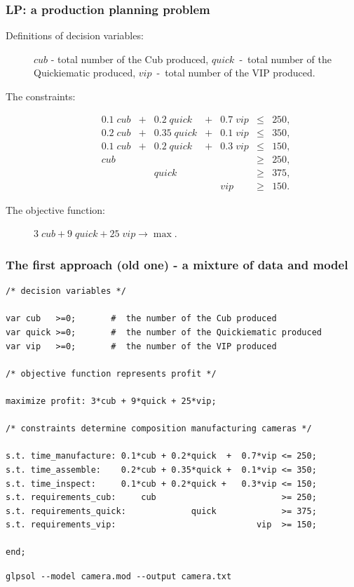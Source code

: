 \documentclass[landscape]{beamer}
\begin{document}
\begin{frame}
  \frametitle{LP: a production planning problem}
    \begin{description}
     \item[Definitions of decision variables:]
       $cub$ - total number of the Cub produced,
       $quick$~-~total number of the Quickiematic produced,
       $vip$~-~total number of the VIP produced.      
     \item[The constraints:]
     \[
       \begin{array}{rrrrrrr}
         0.1\; cub& +& 0.2\;   quick& +&  0.7\;  vip &\leq& 250,\\
         0.2\;  cub &+ &0.35\;  quick &+ & 0.1 \; vip &\leq& 350,\\
         0.1\;  cub& +& 0.2 \;  quick& + &0.3\;  vip &\leq& 150,\\
                cub &  &                &    &            &\geq& 250,\\
                       &  &        quick&    &            &\geq& 375,\\
                       &  &         &    &            vip  &\geq& 150.       
       \end{array}
       \]
     \item[The objective function:]
       $ 3\;  cub + 9\;  quick + 25\;  vip \rightarrow \max$.
   \end{description}
 
\end{frame}  
\begin{frame}[fragile]
  \frametitle{The first approach (old one) - a mixture of data and model} 
\begin{tiny}
\begin{verbatim}
/* decision variables */

var cub   >=0;       #  the number of the Cub produced
var quick >=0;       #  the number of the Quickiematic produced
var vip   >=0;       #  the number of the VIP produced

/* objective function represents profit */

maximize profit: 3*cub + 9*quick + 25*vip;

/* constraints determine composition manufacturing cameras */

s.t. time_manufacture: 0.1*cub + 0.2*quick  +  0.7*vip <= 250;   
s.t. time_assemble:    0.2*cub + 0.35*quick +  0.1*vip <= 350;
s.t. time_inspect:     0.1*cub + 0.2*quick +   0.3*vip <= 150;
s.t. requirements_cub:     cub                         >= 250;
s.t. requirements_quick:             quick             >= 375;
s.t. requirements_vip:                            vip  >= 150;

end;
\end{verbatim}
\end{tiny}  
\verb=glpsol --model camera.mod --output camera.txt=
\end{frame}  
\end{document}
